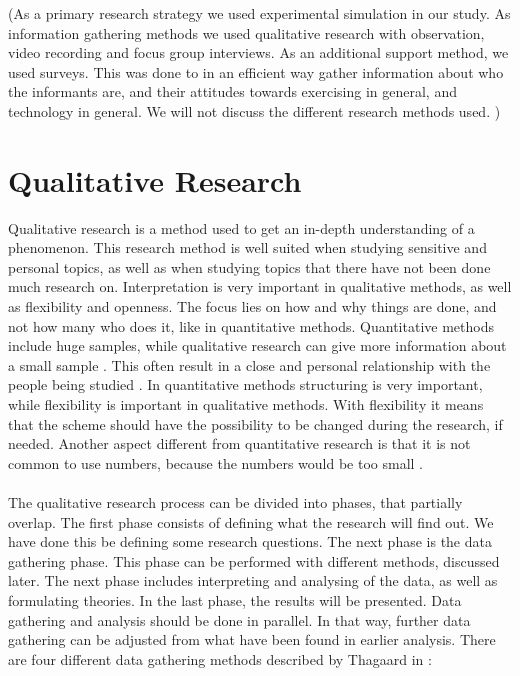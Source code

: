 (As a primary research strategy we used experimental simulation in our study.  As information gathering methods we used qualitative research with observation, video recording and focus group interviews.  As an additional support method, we used surveys. This was done to in an efficient way gather information about  who the informants are, and their attitudes towards exercising in general, and technology in general. We will not discuss the different research methods used. )


\section{Qualitative Research}
Qualitative research is a method used to get an in-depth understanding of a phenomenon. This research method is well suited when studying sensitive and personal topics, as well as when studying topics that there have not been done much research on. Interpretation is very important in qualitative methods, as well as flexibility and openness. The focus lies on how and why things are done, and not how many who does it, like in quantitative methods. Quantitative methods include huge samples, while qualitative research can give more information about a small sample \cite{qualitative}. This often result in a close and personal relationship with the people being studied \cite{tjora}. In quantitative methods structuring is very important, while flexibility is important in qualitative methods. With flexibility it means that the scheme should have the possibility to be changed during the research, if needed. Another aspect different from quantitative research is that it is not common to use numbers, because the numbers would be too small \cite{qualitative}. \\ \\
The qualitative research process can be divided into phases, that partially overlap. The first phase consists of defining what the research will find out. We have done this be defining some research questions. The next phase is the data gathering phase. This phase can be performed with different methods, discussed later. The next phase includes interpreting and analysing of the data, as well as formulating theories. In the last phase, the results will be presented. Data gathering and analysis should be done in parallel. In that way, further data gathering can be adjusted from what have been found in earlier analysis. There are four different data gathering methods described by Thagaard in \cite{qualitative}:

